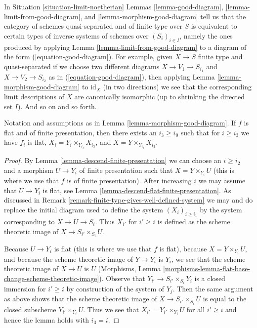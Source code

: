 \begin{remark}
\label{remark-finite-type-gives-well-defined-system}
In Situation \ref{situation-limit-noetherian}
Lemmas \ref{lemma-good-diagram}, \ref{lemma-limit-from-good-diagram}, and
\ref{lemma-morphism-good-diagram}
tell us that the category of schemes quasi-separated and
of finite type over $S$ is equivalent to certain types of
inverse systems of schemes over $(S_i)_{i \in I}$, namely
the ones produced by applying Lemma \ref{lemma-limit-from-good-diagram}
to a diagram of the form (\ref{equation-good-diagram}).
For example, given $X \to S$ finite type and quasi-separated
if we choose two different diagrams $X \to V_1 \to S_{i_1}$
and $X \to V_2 \to S_{i_2}$ as in (\ref{equation-good-diagram}), then
applying Lemma \ref{lemma-morphism-good-diagram} to $\text{id}_X$
(in two directions)
we see that the corresponding limit descriptions of
$X$ are canonically isomorphic (up to shrinking the
directed set $I$). And so on and so forth.
\end{remark}

\begin{lemma}
\label{lemma-morphism-good-diagram-flat}
Notation and assumptions as in Lemma \ref{lemma-morphism-good-diagram}.
If $f$ is flat and of finite presentation, then
there exists an $i_3 \geq i_0$ such that for $i \geq i_3$ we have
$f_i$ is flat, $X_i = Y_i \times_{Y_{i_3}} X_{i_3}$, and
$X = Y \times_{Y_{i_3}} X_{i_3}$.
\end{lemma}

\begin{proof}
By Lemma \ref{lemma-descend-finite-presentation}
we can choose an $i \geq i_2$ and a morphism
$U \to Y_i$ of finite presentation such that $X = Y \times_{Y_i} U$
(this is where we use that $f$ is of finite presentation).
After increasing $i$ we may assume that $U \to Y_i$ is flat, see
Lemma \ref{lemma-descend-flat-finite-presentation}.
As discussed in Remark \ref{remark-finite-type-gives-well-defined-system}
we may and do replace the initial diagram used to define the system
$(X_i)_{i \geq i_1}$ by the system corresponding to
$X \to U \to S_i$. Thus $X_{i'}$ for $i' \geq i$ is defined as
the scheme theoretic image of $X \to S_{i'} \times_{S_i} U$.

\medskip\noindent
Because $U \to Y_i$ is flat (this is where we use that $f$ is flat),
because $X = Y \times_{Y_i} U$, and
because the scheme theoretic image of $Y \to Y_i$ is $Y_i$,
we see that the scheme theoretic image of $X \to U$ is $U$
(Morphisms, Lemma
\ref{morphisms-lemma-flat-base-change-scheme-theoretic-image}).
Observe that $Y_{i'} \to S_{i'} \times_{S_i} Y_i$ is a closed
immersion for $i' \geq i$ by construction of the system of $Y_j$.
Then the same argument as above shows that the scheme theoretic image
of $X \to S_{i'} \times_{S_i} U$
is equal to the closed subscheme $Y_{i'} \times_{Y_i} U$.
Thus we see that $X_{i'} = Y_{i'} \times_{Y_i} U$ for all $i' \geq i$
and hence the lemma holds with $i_3 = i$.
\end{proof}

